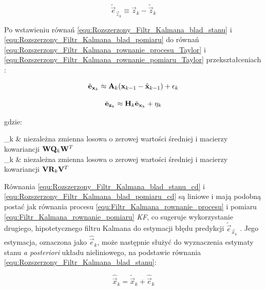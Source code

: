 \begin{equation}
\label{equ:Rozszerzony_Filtr_Kalmana_blad_pomiaru}
	\tilde{\vec{e}}_{\vec{z}_k} \equiv \vec{z}_k - \tilde{\vec{z}}_k
\end{equation}

Po wstawieniu równań \ref{equ:Rozszerzony_Filtr_Kalmana_blad_stanu} i \ref{equ:Rozszerzony_Filtr_Kalmana_blad_pomiaru} do równań \ref{equ:Rozszerzony_Filtr_Kalmana_rownanie_procesu_Taylor} i \ref{equ:Rozszerzony_Filtr_Kalmana_rownanie_pomiaru_Taylor} przekształceniach \cite{Welch1995}:

\begin{equation}
\label{equ:Rozszerzony_Filtr_Kalmana_blad_stanu_cd}
	\tilde{\mathbf{e}}_{\mathbf{x}_k} \approx \mathbf{A}_k(\mathbf{x}_{k-1} - \hat{\mathbf{x}}_{k-1}) + \mathbf{\epsilon}_k
\end{equation}

\begin{equation}
\label{equ:Rozszerzony_Filtr_Kalmana_blad_pomiaru_cd}
	\tilde{\mathbf{e}}_{\mathbf{z}_k} \approx \mathbf{H}_k \tilde{\mathbf{e}}_{\mathbf{x}_k} + \mathbf{\eta}_k
\end{equation}

\noindent
gdzie:

\begin{conditions}
	\vec{\epsilon}_k & niezależna zmienna losowa o zerowej wartości średniej i macierzy kowariancji $\mathbf{W}\mathbf{Q}_k\mathbf{W}^T$ \\
	\vec{\eta}_k & niezależna zmienna losowa o zerowej wartości średniej i macierzy kowariancji $\mathbf{V}\mathbf{R}_k\mathbf{V}^T$ \\
\end{conditions}

Równania \ref{equ:Rozszerzony_Filtr_Kalmana_blad_stanu_cd} i \ref{equ:Rozszerzony_Filtr_Kalmana_blad_pomiaru_cd} są liniowe i mają podobną postać jak równania procesu \ref{equ:Filtr_Kalmana_rownanie_procesu} i pomiaru \ref{equ:Filtr_Kalmana_rownanie_pomiaru} \textit{KF}, co sugeruje wykorzystanie drugiego, hipotetycznego filtru Kalmana do estymacji błędu predykcji $\tilde{\vec{e}}_{\vec{x}_k}$ \cite{Welch1995}. Jego estymacja, oznaczona jako $\hat{\vec{e}}_k$, może następnie służyć do wyznaczenia estymaty stanu \textit{a posteriori} układu nieliniowego, na podstawie równania \ref{equ:Rozszerzony_Filtr_Kalmana_blad_stanu}:

\begin{equation}
\label{equ:Rozszerzony_Filtr_Kalmana_estymacja_stanu}
	\hat{\vec{x}}_k = \tilde{\vec{x}}_k + \hat{\vec{e}}_k
\end{equation}

